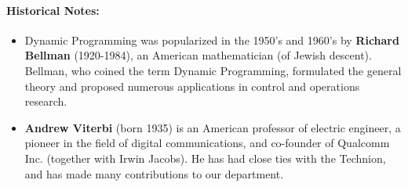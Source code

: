\paragraph{Historical Notes:}
\begin{itemize}
  \item Dynamic Programming was popularized in the 1950's and 1960's by \textbf{Richard Bellman} (1920-1984), an American mathematician (of Jewish descent). Bellman, who coined the term Dynamic Programming, formulated the general theory and proposed numerous applications in control and operations research.
  \item \textbf{Andrew Viterbi} (born 1935) is an American professor of electric engineer, a pioneer in the field of digital communications, and co-founder of Qualcomm Inc. (together with Irwin Jacobs). He has had close ties with the Technion, and has made many contributions to our department.
\end{itemize}




%

